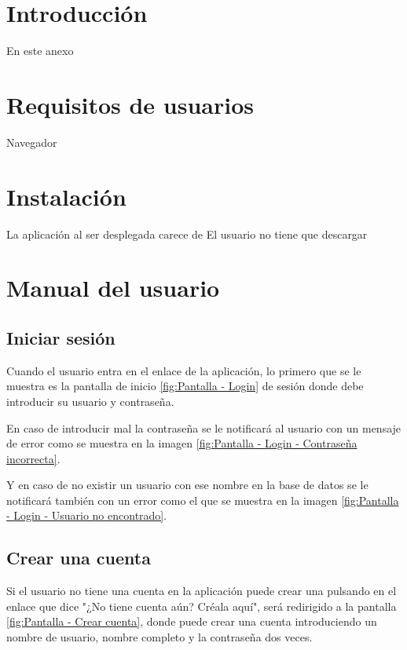 
\section{Introducción}
En este anexo


\section{Requisitos de usuarios}

Navegador

\section{Instalación}

La aplicación al ser desplegada carece de 
El usuario no tiene que descargar

\section{Manual del usuario}


\subsection{Iniciar sesión}\label{inicio-sesión}
Cuando el usuario entra en el enlace de la aplicación, lo primero que se le muestra es la pantalla de inicio \ref{fig:Pantalla - Login} de sesión donde debe introducir su usuario y contraseña.

En caso de introducir mal la contraseña se le notificará al usuario con un mensaje de error como se muestra en la imagen \ref{fig:Pantalla - Login - Contraseña incorrecta}.

Y en caso de no existir un usuario con ese nombre en la base de datos se le notificará también con un error como el que se muestra en la imagen \ref{fig:Pantalla - Login - Usuario no encontrado}.


\subsection{Crear una cuenta}\label{crear-cuenta}

Si el usuario no tiene una cuenta en la aplicación puede crear una pulsando en el enlace que dice "¿No tiene cuenta aún? Créala aquí", será redirigido a la pantalla  \ref{fig:Pantalla - Crear cuenta}, donde puede crear una cuenta introduciendo un nombre de usuario, nombre completo y la contraseña dos veces.

